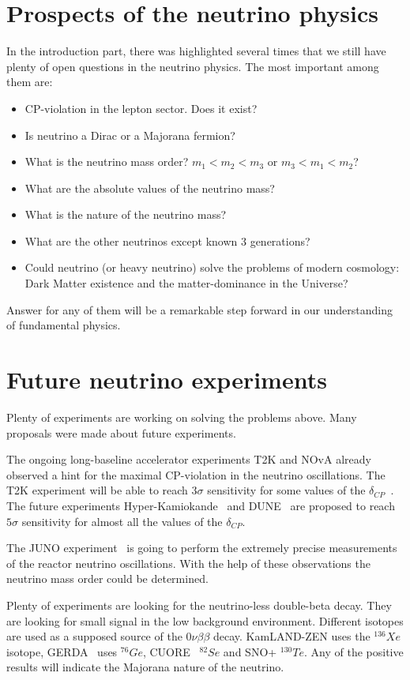 \documentclass[../main.tex]{subfiles}
\begin{document}
\section{Prospects of the neutrino physics}
In the introduction part, there was highlighted several times that we still have plenty of open questions in the neutrino physics. The most important among them are:
\begin{itemize}
  \item CP-violation in the lepton sector. Does it exist?
  \item Is neutrino a Dirac or a Majorana fermion?
  \item What is the neutrino mass order? $m_1<m_2<m_3$ or $m_3<m_1<m_2$?
  \item What are the absolute values of the neutrino mass?
  \item What is the nature of the neutrino mass?
  \item What are the other neutrinos except known 3 generations?
  \item Could neutrino (or heavy neutrino) solve the problems of modern cosmology: Dark Matter existence and the matter-dominance in the Universe?
\end{itemize}

Answer for any of them will be a remarkable step forward in our understanding of fundamental physics.

\section{Future neutrino experiments}
\label{intro:future}
Plenty of experiments are working on solving the problems above. Many proposals were made about future experiments.

The ongoing long-baseline accelerator experiments T2K and NOvA already observed a hint for the maximal CP-violation in the neutrino oscillations. The T2K experiment will be able to reach $3\sigma$ sensitivity for some values of the $\delta_{CP}$~\cite{Abe2016e}. The future experiments Hyper-Kamiokande~\cite{Proto-Collaboration2018} and DUNE~\cite{Acciarri2016} are proposed to reach $5\sigma$ sensitivity for almost all the values of the $\delta_{CP}$.

The JUNO experiment~\cite{Cerna2020} is going to perform the extremely precise measurements of the reactor neutrino oscillations. With the help of these observations the neutrino mass order could be determined.

Plenty of experiments are looking for the neutrino-less double-beta decay. They are looking for small signal in the low background environment. Different isotopes are used as a supposed source of the $0\nu\beta\beta$ decay. KamLAND-ZEN uses the ${}^{136}Xe$ isotope, GERDA~\cite{DiMarco2020} uses ${}^{76}Ge$, CUORE~\cite{Cardani2020} ${}^{82}Se$ and SNO+ ${}^{130}Te$. Any of the positive results will indicate the Majorana nature of the neutrino.
\end{document}
